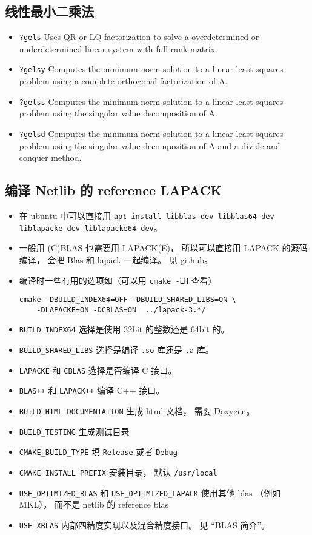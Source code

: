 \subsection{线性最小二乘法}
\begin{itemize}
\item \verb|?gels| Uses QR or LQ factorization to solve a overdetermined or underdetermined linear system with full rank matrix.
\item \verb|?gelsy| Computes the minimum-norm solution to a linear least squares problem using a complete orthogonal factorization of A.
\item \verb|?gelss| Computes the minimum-norm solution to a linear least squares problem using the singular value decomposition of A.
\item \verb|?gelsd| Computes the minimum-norm solution to a linear least squares problem using the singular value decomposition of A and a divide and conquer method.
\end{itemize}

\subsection{编译 Netlib 的 reference LAPACK}
\begin{itemize}
\item 在 ubuntu 中可以直接用 \verb|apt install libblas-dev libblas64-dev liblapacke-dev liblapacke64-dev|。
\item 一般用 (C)BLAS 也需要用 LAPACK(E)， 所以可以直接用 LAPACK 的源码编译， 会把 Blas 和 lapack 一起编译。 见 \href{https://github.com/Reference-LAPACK/lapack/}{github}。
\item 编译时一些有用的选项如（可以用 \verb|cmake -LH| 查看）
\begin{lstlisting}[language=none]
cmake -DBUILD_INDEX64=OFF -DBUILD_SHARED_LIBS=ON \
    -DLAPACKE=ON -DCBLAS=ON  ../lapack-3.*/
\end{lstlisting}
\item \verb|BUILD_INDEX64| 选择是使用 32bit 的整数还是 64bit 的。
\item \verb|BUILD_SHARED_LIBS| 选择是编译 \verb|.so| 库还是 \verb|.a| 库。
\item \verb|LAPACKE| 和 \verb|CBLAS| 选择是否编译 C 接口。
\item \verb|BLAS++| 和 \verb|LAPACK++| 编译 C++ 接口。
\item \verb|BUILD_HTML_DOCUMENTATION| 生成 html 文档， 需要 Doxygen。
\item \verb|BUILD_TESTING| 生成测试目录
\item \verb|CMAKE_BUILD_TYPE| 填 \verb|Release| 或者 \verb|Debug|
\item \verb|CMAKE_INSTALL_PREFIX| 安装目录， 默认 \verb|/usr/local|
\item \verb|USE_OPTIMIZED_BLAS| 和 \verb|USE_OPTIMIZED_LAPACK| 使用其他 blas （例如 MKL）， 而不是 netlib 的 reference blas
\item \verb|USE_XBLAS| 内部四精度实现以及混合精度接口。 见 “BLAS 简介\upref{BLAS}”。
\end{itemize}

